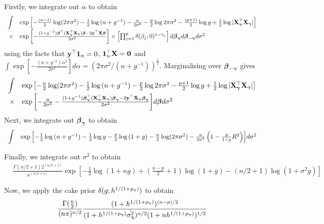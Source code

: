 \documentclass{amsart}[12pt]
\theoremstyle{definition}
\begin{document}
\noindent Firstly, we integrate out $\alpha$ to obtain
$$
\begin{array}{rl}
		\displaystyle \int & \exp{\left[
		-\frac{(n - 1)}{2} \log (2 \pi \sigma^2) 
		-\frac{1}{2} \log{(n + g^{-1})} 
		-\frac{n}{2 \sigma^2}
		-\frac{p}{2} \log{2\pi \sigma^2} 
		-\frac{(p + 1)}{2} \log{g} 
		+\frac{1}{2} \log{|{\bf X}_{\boldsymbol\gamma}^\top {\bf X}_{\boldsymbol\gamma}|} \right]}\\
		\times&\exp{\left[
		-\frac{(1 + g^{-1}){\boldsymbol\beta}^\top ({\bf X}_{\boldsymbol\gamma}^\top {\bf X}_{\boldsymbol\gamma}) {\boldsymbol\beta}- 2 {\bf y}^\top {\bf X}{\boldsymbol\beta}}{2 \sigma^{2}} 
		\right]} 
		\times \left[ \prod_{j=1}^p \delta(\beta_j; 0)^{1 - \gamma_j} \right] d {\boldsymbol \beta}_{{\boldsymbol \gamma}} d {\boldsymbol \beta}_{-{\boldsymbol \gamma}} d \sigma^2
\end{array}
$$
using the facts that ${\bf y}^\top {\bf1}_n = 0$, ${\bf 1}_n^\top {\bf X} = {\bf 0}$ and $\int \exp{\left[-\frac{(n + g^{-1})\alpha^2}{2 \sigma^{2}} \right]} d \alpha = (2 \pi \sigma^{2} / (n + g^{-1}))^{\frac{1}{2}}$.
Marginalising over ${\boldsymbol \beta}_{-{\boldsymbol \gamma}}$ gives
$$
\begin{array}{rl}
		\displaystyle \int &\exp{\left[
		-\frac{n}{2} \log (2 \pi \sigma^2) 
		- \frac{1}{2} \log{(n + g^{-1})}
		-\frac{p}{2} \log{2\pi \sigma^2} 
		- \frac{p + 1}{2} \log{g}
		+ \frac{1}{2} \log{|{\bf X}_{\boldsymbol\gamma}^\top {\bf X}_{\boldsymbol\gamma}|} 
		\right]} \\
		\times&\exp{\left[
		-\frac{n}{2 \sigma^2}
		-\frac{(1 + g^{-1}){\boldsymbol\beta}_{\boldsymbol\gamma}^\top ({\bf X}_{\boldsymbol\gamma}^\top {\bf X}_{\boldsymbol\gamma}) {\boldsymbol\beta}_{\boldsymbol\gamma}- 2{\bf y}^\top{\bf X}_{\boldsymbol\gamma}{\boldsymbol\beta}_{\boldsymbol\gamma}}{2 \sigma^{2}} \right]} d {\boldsymbol \beta} d \sigma^2
\end{array}
$$
\noindent Next, we integrate out ${\boldsymbol \beta}_{{\boldsymbol \gamma}}$ to obtain
$$
\begin{array}{rl}
		\displaystyle \int &\exp{\left[
		- \frac{1}{2} \log{(n + g^{-1})}
		- \frac{1}{2} \log{g}
		-\frac{p}{2} \log{(1 + g)}
		-\frac{n}{2} \log (2 \pi \sigma^2) 
		-\frac{n}{2 \sigma^2} \left(1 - \frac{g}{1 + g} R^2\right)
		\right]}  d \sigma^2
\end{array}
$$

\noindent Finally, we integrate out $\sigma^2$ to obtain
$$
\begin{array}{rl}
		&
		\frac{\Gamma(n/2 + 1)
		2^{(n/2 + 1)}}
		{n^(n/2 + 1)}
		\exp{\left[
		- \frac{1}{2} \log{(1 + ng)}
		+(\frac{n - p}{2} + 1) \log(1 + g)
		-(n/2 + 1) \log(1 + \sigma^2 g)
		\right]}
\end{array}
$$

Now, we apply the cake prior $\delta(g; h^{1/(1 + p_{\boldsymbol \gamma})})$ to obtain
\[
	\frac{\Gamma(\frac{n}{2})}{(n \pi)^{n/2}} \frac{(1 + h^{1/(1 + p_{\boldsymbol \gamma})})^{(n-p)/2}}{(1 + h^{1/(1 + p_{\boldsymbol \gamma})} \hat{\sigma^2_{\boldsymbol \gamma}})^{n/2} (1 + nh^{1/(1 + p_{\boldsymbol \gamma})})^{1/2}}
\]
\end{document}
